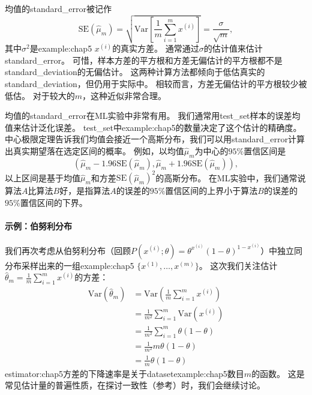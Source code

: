 均值的\gls{standard_error}被记作
\begin{equation}
\label{eq:5.46}
    \text{SE}(\hat{\mu}_m) = \sqrt{ \text{Var} \left[ \frac{1}{m} \sum_{i=1}^m x^{(i)} \right] } = \frac{\sigma}{\sqrt{m}},
\end{equation}
其中$\sigma^2$是\gls{example:chap5} $x^{(i)}$的真实方差。
通常通过$\sigma$的估计值来估计\gls{standard_error}。
可惜，样本方差的平方根和方差无偏估计的平方根都不是\gls{standard_deviation}的无偏估计。
这两种计算方法都倾向于低估真实的\gls{standard_deviation}，但仍用于实际中。
相较而言，方差无偏估计的平方根较少被低估。
对于较大的$m$，这种近似非常合理。


均值的\gls{standard_error}在\gls{ML}实验中非常有用。
我们通常用\gls{test_set}样本的误差均值来估计泛化误差。
\gls{test_set}中\gls{example:chap5}的数量决定了这个估计的精确度。
中心极限定理告诉我们均值会接近一个高斯分布，我们可以用\gls{standard_error}计算出真实期望落在选定区间的概率。
例如，以均值$\hat{\mu}_m$为中心的$95\%$置信区间是
\begin{equation}
\label{eq:confidence_interval}
    ( \hat{\mu}_m - 1.96\text{SE}(\hat{\mu}_m), \hat{\mu}_m + 1.96 \text{SE}(\hat{\mu}_m) ),
\end{equation}
以上区间是基于均值$\hat{\mu}_m$和方差$\text{SE}(\hat{\mu}_m)^2$的高斯分布。
在\gls{ML}实验中，我们通常说算法$A$比算法$B$好，是指算法$A$的误差的$95\%$置信区间的上界小于算法$B$的误差的$95\%$置信区间的下界。

\paragraph{示例：伯努利分布} 我们再次考虑从伯努利分布（回顾$P(x^{(i)}; \theta) = \theta^{x^{(i)}} (1-\theta)^{1 - x^{(i)}}$）中独立同分布采样出来的一组\gls{example:chap5} $\{ x^{(1)}, \dots, x^{(m)} \}$。
这次我们关注估计$\hat{\theta}_m = \frac{1}{m} \sum_{i=1}^m x^{(i)}$的方差：
\begin{align}
    \text{Var}\left( \hat{\theta}_m \right) &= \text{Var}\left( \frac{1}{m} \sum_{i=1}^m x^{(i)} \right) \\
    &= \frac{1}{m^2} \sum_{i=1}^m \text{Var} \left( x^{(i)} \right) \\
    &= \frac{1}{m^2} \sum_{i=1}^m \theta (1 - \theta) \\
    &= \frac{1}{m^2} m\theta(1-\theta) \\
    &= \frac{1}{m} \theta(1-\theta)
\end{align} 
\gls{estimator:chap5}方差的下降速率是关于\gls{dataset}\gls{example:chap5}数目$m$的函数。
这是常见估计量的普遍性质，在探讨一致性（参考）时，我们会继续讨论。

